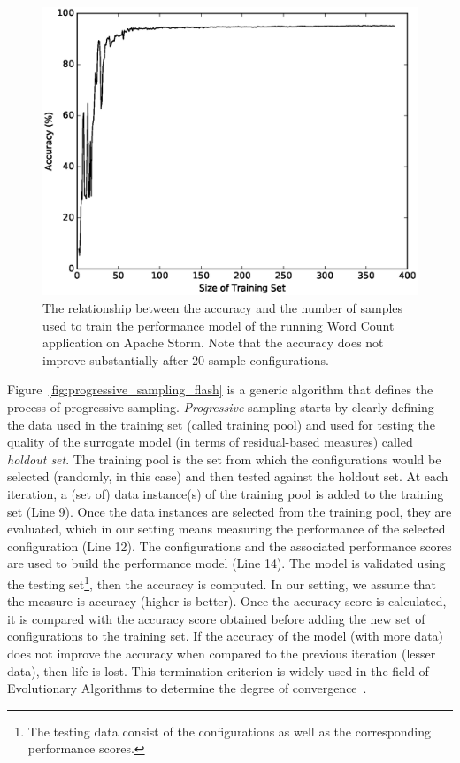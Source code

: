 \begin{figure}[t]
\centering
\includegraphics[scale=0.4]{Chapter-Flash/figures/figure1.eps}
\caption[The relationship between the accuracy and the number of samples used to train the performance model of the running Word Count application on Apache Storm.]{{\small The relationship between the accuracy and the number of samples used to train the performance model of the running Word Count application on Apache Storm. Note that the accuracy does not improve substantially after 20 sample configurations.}
}
\label{fig:learning_curve_flash}
\end{figure}





Figure~\ref{fig:progressive_sampling_flash} is a generic algorithm that defines the process of progressive sampling. \emph{Progressive} sampling starts by clearly defining the data used in the training set (called training pool) and used for testing the quality of the surrogate model (in terms of residual-based measures) called \textit{holdout set}. The training pool is the set from which the configurations would be selected (randomly, in this case) and then tested against the holdout set. At each iteration, a (set of) data instance(s) of the training pool is added to the training set (Line 9). Once the data instances are selected from the training pool, they are evaluated, which in our setting means measuring the performance of the selected configuration (Line 12). The configurations and the associated performance scores are used to build the performance model (Line 14). The model is validated using the testing set\footnote{The testing data consist of the configurations as well as the corresponding performance scores.}, then the accuracy is computed. In our setting, we assume that the measure is accuracy (higher is better). Once the accuracy score is calculated, it is compared with the accuracy score obtained before adding the new set of configurations to the training set. If the accuracy of the model (with more data) does not improve the accuracy when compared to the previous iteration (lesser data), then life is lost. This termination criterion is widely used in the field of Evolutionary Algorithms to determine the degree of convergence~\cite{krall2015gale}.


